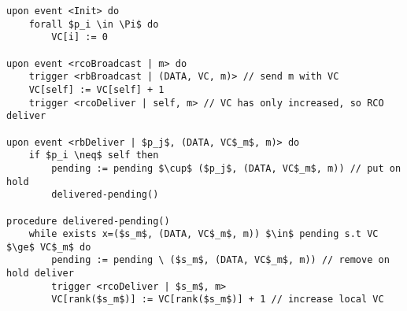 \begin{lstlisting}[caption={Vector Clock Causal Order broadcast}, mathescape]
upon event <Init> do
    forall $p_i \in \Pi$ do
        VC[i] := 0

upon event <rcoBroadcast | m> do
    trigger <rbBroadcast | (DATA, VC, m)> // send m with VC
    VC[self] := VC[self] + 1
    trigger <rcoDeliver | self, m> // VC has only increased, so RCO deliver

upon event <rbDeliver | $p_j$, (DATA, VC$_m$, m)> do
    if $p_i \neq$ self then
        pending := pending $\cup$ ($p_j$, (DATA, VC$_m$, m)) // put on hold
        delivered-pending()

procedure delivered-pending()
    while exists x=($s_m$, (DATA, VC$_m$, m)) $\in$ pending s.t VC $\ge$ VC$_m$ do
        pending := pending \ ($s_m$, (DATA, VC$_m$, m)) // remove on hold deliver
        trigger <rcoDeliver | $s_m$, m>
        VC[rank($s_m$)] := VC[rank($s_m$)] + 1 // increase local VC
\end{lstlisting}
